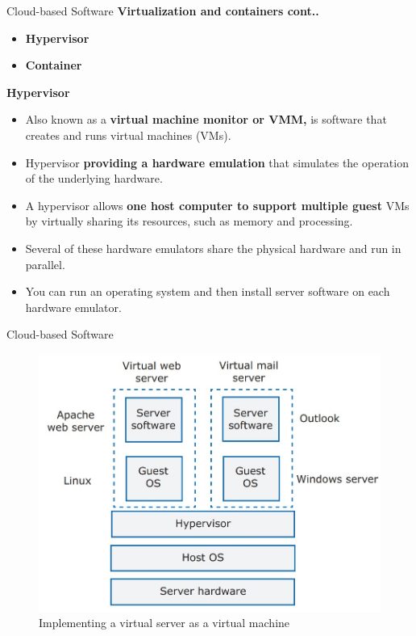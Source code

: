 \documentclass{beamer}
\begin{document}
\begin{frame}{Cloud-based Software}
	\textbf{Virtualization and containers cont..}
\begin{itemize}
	\item \textbf{Hypervisor}
	\item \textbf{Container }
\end{itemize}
 \textbf{Hypervisor}
	\begin{itemize}
		\item Also known as a\textbf{ virtual machine monitor or VMM,} is software that creates and runs virtual machines (VMs). 
		\item Hypervisor \textbf{providing a hardware emulation} that simulates 
		the operation of the underlying hardware. 
		\item  A hypervisor allows \textbf{one host computer to support multiple guest} VMs by virtually sharing its resources, such as memory and processing.
		\item Several of these hardware emulators share the physical hardware and run in parallel. 
		\item You can run an operating system and then install server software on each hardware emulator.
	\end{itemize}	
\end{frame}
\begin{frame}{Cloud-based Software}
\begin{figure}
	\includegraphics[scale=.4]{img/m5_6}
		\caption{Implementing a virtual server as a virtual machine}
\end{figure}
\end{frame}
\end{document}
